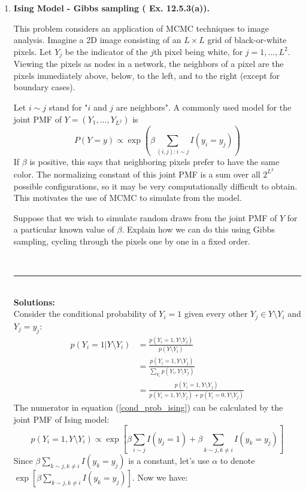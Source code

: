 \documentclass{article}
\begin{document}
\begin{enumerate}
\item {\bf Ising Model - Gibbs sampling (\cite{blitzstein2014introduction} Ex. 12.5.3(a)).}

This problem considers an application of MCMC techniques to image analysis. Imagine a 2D image consisting of an $L\times L$ grid of black-or-white pixels. Let $Y_j$ be the indicator of the $j$th pixel being white, for $j = 1,..., L^2$. Viewing the pixels as nodes in a network, the neighbors of a pixel are the pixels immediately above, below, to the left, and to the right (except for boundary cases).

Let $i \sim j$ stand for "$i$ and $j$ are neighbors". A commonly used model for the joint PMF
of $Y = (Y_1,... , Y_{L^2})$ is
$$P(Y = y) \propto \exp (\beta \sum_{(i,j): i \sim j} I(y_i = y_j))$$
If $\beta$ is positive, this says that neighboring pixels prefer to have the same color. The normalizing constant of this joint PMF is a sum over all $2^{L^2}$
possible configurations, so it may be very computationally difficult to obtain. This motivates the use of MCMC to
simulate from the model.

Suppose that we wish to simulate random draws from the joint PMF of $Y$ for a particular known value of $\beta$. Explain how we can do this using Gibbs sampling, cycling
through the pixels one by one in a fixed order.


\noindent
\\
\noindent\rule{14cm}{2pt}
\\
\textbf{Solutions:}
\\
Consider the conditional probability of $Y_i=1$ given every other $Y_j \in Y\setminus Y_i$ and $Y_j = y_j$:
\begin{align}
p(Y_i=1 | Y\setminus Y_i) &= \frac{p(Y_i=1, Y\setminus Y_j)}{p(Y\setminus Y_i)}\\
&=\frac{p(Y_i=1, Y\setminus Y_j)}{\sum_{Y_i}p(Y_i, Y\setminus Y_j)}\\
&=\frac{p(Y_i=1, Y\setminus Y_j)}{p(Y_i=1, Y\setminus Y_j)+p(Y_i=0, Y\setminus Y_j)}\label{cond_prob_ising}
\end{align}
The numerator in equation (\ref{cond_prob_ising}) can be calculated by the joint PMF of Ising model:
\begin{equation}
p(Y_i=1, Y\setminus Y_i) \propto \exp[\beta \sum_{i\sim j}I(y_j = 1) + \beta \sum_{k\sim j,k \neq i}I(y_k=y_j)]
\end{equation}
Since $\beta \sum_{k\sim j,k \neq i}I(y_k=y_j)$ is a constant, let's use $\alpha$ to denote $\exp[\beta \sum_{k\sim j,k \neq i}I(y_k=y_j)]$. Now we have:


\end{enumerate}
\end{document}
